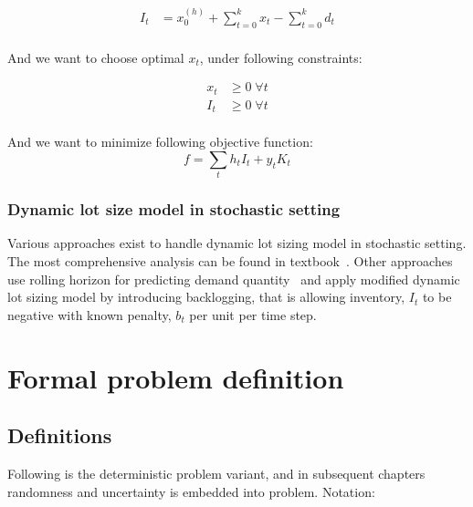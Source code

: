 \begin{align*}
  I_t &= x^{(h)}_0 + \sum_{t=0}^k{x_t} - \sum_{t=0}^k{d_t}\\
\end{align*}

And we want to choose optimal $x_t$, under following constraints:

\begin{align*}
  x_t &\ge 0 \; \forall t\\
  I_t &\ge 0 \; \forall t\\
\end{align*}

And we want to minimize following objective function:
\begin{equation*}
  f = \sum_t{h_t I_t + y_t K_t}
\end{equation*}


\subsubsection{Dynamic lot size model in stochastic setting}
\label{sub:Dynamic lot size model in stochastic setting}

Various approaches exist to handle dynamic lot sizing model in stochastic setting. The most comprehensive analysis can be found in textbook~\cite{tempelmeier2013stochastic}. Other approaches use rolling horizon for predicting demand quantity~\cite{cao2013adaptive} and apply modified dynamic lot sizing model by introducing backlogging, that is allowing inventory, $I_t$ to be negative with known penalty, $b_t$ per unit per time step.
\section{Formal problem definition}
\label{sec:prob-def}

\subsection{Definitions}
\label{sub:Definitions}

Following is the deterministic problem variant, and in subsequent chapters randomness and uncertainty is embedded into problem. Notation:

